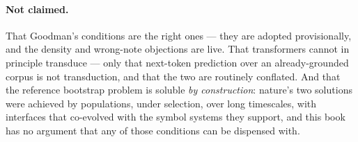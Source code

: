 \paragraph{Not claimed.}
That Goodman's conditions are the right ones --- they are adopted
provisionally, and the density and wrong-note objections are live.
That transformers cannot in principle transduce --- only that
next-token prediction over an already-grounded corpus is not
transduction, and that the two are routinely conflated.
And that the reference bootstrap problem is soluble \emph{by
construction}: nature's two solutions were achieved by populations,
under selection, over long timescales, with interfaces that
co-evolved with the symbol systems they support, and this book has
no argument that any of those conditions can be dispensed with.
